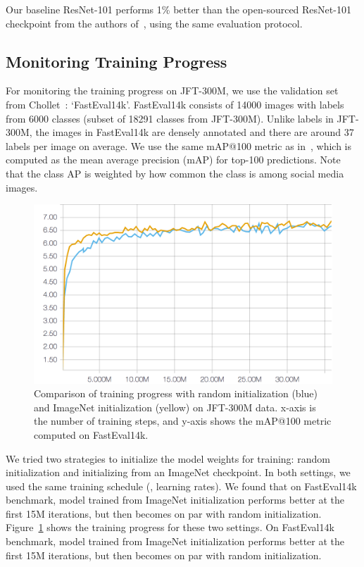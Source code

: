 \documentclass[10pt,twocolumn,letterpaper]{article}
\begin{document}
Our baseline ResNet-101 performs 1\% better than the open-sourced ResNet-101 checkpoint from the authors of~\cite{he2016resnet}, using the same evaluation protocol. 

\subsection{Monitoring Training Progress}
For monitoring the training progress on JFT-300M, we use the validation set from Chollet~\cite{Chollet}: `FastEval14k'. FastEval14k consists of 14000 images with labels from 6000 classes (subset of 18291 classes from JFT-300M). Unlike labels in JFT-300M, the images in FastEval14k are densely annotated and there are around 37 labels per image on average. We use the same mAP@100 metric as in~\cite{Chollet}, which is computed as the mean average precision (mAP) for top-100 predictions. Note that the class AP is weighted by how common the class is among social media images.


\begin{figure}[t]
\center
\includegraphics[width=0.6\columnwidth]{300m_progress}
\caption{Comparison of training progress with random initialization (blue) and ImageNet initialization (yellow) on JFT-300M data. x-axis is the number of training steps, and y-axis shows the mAP@100 metric computed on FastEval14k.}
\label{fig:300m_progress}
\end{figure}

We tried two strategies to initialize the model weights for training: random initialization and initializing from an ImageNet checkpoint. In both settings, we used the same training schedule (\eg, learning rates). We found that on FastEval14k benchmark, model trained from ImageNet initialization performs better at the first 15M iterations, but then becomes on par with random initialization.
Figure~\ref{fig:300m_progress} shows the training progress for these two settings. On FastEval14k benchmark, model trained from ImageNet initialization performs better at the first 15M iterations, but then becomes on par with random initialization.
\end{document}
